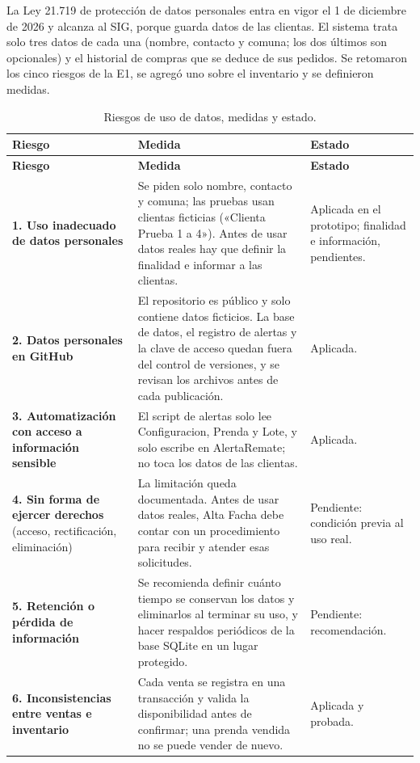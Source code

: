 \documentclass[11pt,letterpaper]{article}
\begin{document}
La Ley 21.719 de protección de datos personales entra en vigor el 1 de diciembre de 2026 y alcanza al SIG, porque guarda datos de las clientas. El sistema trata solo tres datos de cada una (nombre, contacto y comuna; los dos últimos son opcionales) y el historial de compras que se deduce de sus pedidos. Se retomaron los cinco riesgos de la E1, se agregó uno sobre el inventario y se definieron medidas.
{\footnotesize
\setlength{\tabcolsep}{3pt}\renewcommand{\arraystretch}{1.15}
\begin{longtable}{>{\raggedright\arraybackslash}p{}>{\raggedright\arraybackslash}p{}>{\raggedright\arraybackslash}p{}}
\caption{Riesgos de uso de datos, medidas y estado.}\\
\hline
\rowcolor[HTML]{D9EAF7}\textbf{\textbf{Riesgo}} & \textbf{\textbf{Medida}} & \textbf{\textbf{Estado}} \\
\hline
\endfirsthead
\hline
\rowcolor[HTML]{D9EAF7}\textbf{\textbf{Riesgo}} & \textbf{\textbf{Medida}} & \textbf{\textbf{Estado}} \\
\hline
\endhead
\textbf{1. Uso inadecuado de datos personales} & Se piden solo nombre, contacto y comuna; las pruebas usan clientas ficticias («Clienta Prueba 1 a 4»). Antes de usar datos reales hay que definir la finalidad e informar a las clientas. & Aplicada en el prototipo; finalidad e información, pendientes. \\
\hline
\textbf{2. Datos personales en GitHub} & El repositorio es público y solo contiene datos ficticios. La base de datos, el registro de alertas y la clave de acceso quedan fuera del control de versiones, y se revisan los archivos antes de cada publicación. & Aplicada. \\
\hline
\textbf{3. Automatización con acceso a información sensible} & El script de alertas solo lee Configuracion, Prenda y Lote, y solo escribe en AlertaRemate; no toca los datos de las clientas. & Aplicada. \\
\hline
\textbf{4. Sin forma de ejercer derechos} (acceso, rectificación, eliminación) & La limitación queda documentada. Antes de usar datos reales, Alta Facha debe contar con un procedimiento para recibir y atender esas solicitudes. & Pendiente: condición previa al uso real. \\
\hline
\textbf{5. Retención o pérdida de información} & Se recomienda definir cuánto tiempo se conservan los datos y eliminarlos al terminar su uso, y hacer respaldos periódicos de la base SQLite en un lugar protegido. & Pendiente: recomendación. \\
\hline
\textbf{6. Inconsistencias entre ventas e inventario} & Cada venta se registra en una transacción y valida la disponibilidad antes de confirmar; una prenda vendida no se puede vender de nuevo. & Aplicada y probada. \\
\hline
\end{longtable}
}
\end{document}
